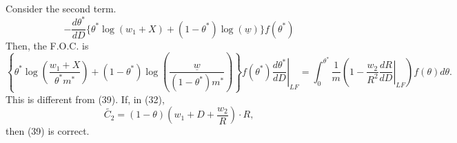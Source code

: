 \documentclass[a4paper,11pt]{article}
\begin{document}
	Consider the second term.
	\begin{equation*}
		- \dfrac{d\theta^*}{dD} \{ \theta^* \log (w_1 + X) + (1-\theta^*) \log (\underline{w}) \} f(\theta^*)
	\end{equation*}
	Then, the F.O.C. is
	\begin{equation*}
		\left\{ \theta^* \log \left( \dfrac{w_1 + X} {\theta^* m^*}\right) + (1-\theta^*) \log \left( \dfrac{\underline{w}}{(1-\theta^*)m^*} \right)   \right\} f(\theta^*) \left. \dfrac{d\theta^*}{dD}\right|_{LF} = \int_0^{\theta^*} \dfrac{1}{m} \left(  1 - \dfrac{w_2}{R^2} \left. \dfrac{dR}{dD}\right|_{LF} \right) f(\theta) d\theta.
	\end{equation*}
	This is different from (39).
	If, in (32), 
	\begin{equation*}
		\tilde{C_2} = (1-\theta) \left(w_1 + D + \dfrac{w_2}{R} \right) \cdot R,
	\end{equation*}
	then (39) is correct.
\end{document}
